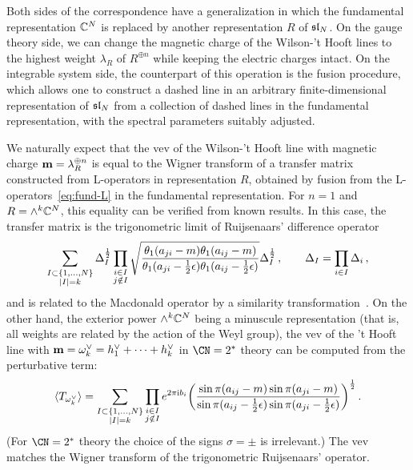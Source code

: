 Both sides of the correspondence have a generalization in which the
fundamental representation $\mathbb{C}^N$ is replaced by another representation $R$
of $\mathfrak{sl}_N$.  On the gauge theory side, we can change the magnetic
charge of the Wilson-'t Hooft lines to the highest weight $\lambda_R$
of $R^{\oplus n}$ while keeping the electric charges intact.  On the
integrable system side, the counterpart of this operation is the
fusion procedure, which allows one to construct a dashed line in an
arbitrary finite-dimensional representation of $\mathfrak{sl}_N$ from a
collection of dashed lines in the fundamental representation, with the
spectral parameters suitably adjusted.

We naturally expect that the vev of the Wilson-'t Hooft line with
magnetic charge $\mathbf{m} = \lambda_R^{\oplus n}$ is equal to the
Wigner transform of a transfer matrix constructed from L-operators in
representation $R$, obtained by fusion from the
L-operators~\eqref{eq:fund-L} in the fundamental representation.
For $n = 1$ and $R = \wedge^k \mathbb{C}^N$, this equality can be verified
from known results.  In this case, the transfer matrix is the
trigonometric limit of Ruijsenaars' difference
operator~\cite{Ruijsenaars:1986pp}
\begin{equation}
  \sum_{\substack{I \subset \{1, \dotsc, N\} \\ |I| = k}}
  \Delta_I^{\frac12}
  \prod_{\substack{i \in I \\ j \notin I}}
  \sqrt{
    \frac{\theta_1(a_{ji} - m) \theta_1(a_{ij} - m)}
          {\theta_1(a_{ji} - \frac12 \epsilon) \theta_1(a_{ij} - \frac12 \epsilon)}
  }
  \Delta_I^{\frac12} \,,
  \qquad
  \Delta_I = \prod_{i \in I} \Delta_i \,,
\end{equation}
and is related to the Macdonald operator by a similarity
transformation~\cite{MR1463830}.  On the other hand, the exterior
power $\wedge^k \mathbb{C}^N$ being a minuscule representation (that is, all
weights are related by the action of the Weyl group), the vev of the
't Hooft line with
$\mathbf{m} = \omega^\vee_k = h^\vee_1 + \dotsb + h^\vee_k$ in
$\CN = 2^*$ theory can be computed from the perturbative term:
\begin{equation}
  \langle T_{\omega^\vee_k} \rangle
  =
  \sum_{\substack{I \subset \{1, \dotsc, N\} \\ |I| = k}}
  \prod_{\substack{i \in I \\ j \notin I}}
  e^{2\pi\mathrm{i} b_i}
  \biggl(
  \frac{\sin\pi(a_{ij} - m) \sin\pi(a_{ji} - m)}
        {\sin\pi(a_{ij} - \frac12\epsilon) \sin\pi(a_{ji} - \frac12\epsilon)}
  \biggr)^{\frac12} \,.
\end{equation}
(For $\CN = 2^*$ theory the choice of the signs $\sigma = \pm$ is
irrelevant.)  The vev matches the Wigner transform of the
trigonometric Ruijsenaars' operator.

